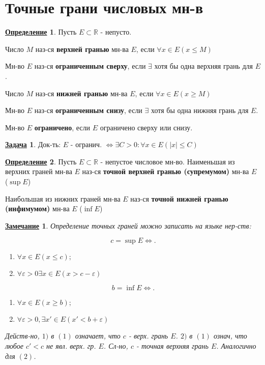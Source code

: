 \documentclass[12pt]{article}
\newcommand{\R}{\mathbb{R}}
\newtheorem*{note}{\underline{Замечание}}
\theoremstyle{definition}
\newtheorem{definition}{\underline{Определение}}[section]
\theoremstyle{definition}
\newtheorem{task}{\underline{Задача}}[section]
\begin{document}
\section{Точные грани числовых мн-в}
\begin{definition}
Пусть $E \subset \R$ - непусто.

Число $M$ наз-ся \textbf{верхней гранью} мн-ва $E$, если $\forall x \in E (x \leq M)$

Мн-во $E$ наз-ся \textbf{ограниченным сверху}, если $\exists $ хотя бы одна верхняя грань для $E$.

Число $M$ наз-ся \textbf{нижней гранью} мн-ва $E$, если $\forall x \in E (x \geq M)$

Мн-во $E$ наз-ся \textbf{ограниченным снизу}, если $\exists $ хотя бы одна нижняя грань для $E$.

Мн-во $E$ \textbf{ограничено}, если $E$ ограничено сверху или снизу.
\end{definition}
\begin{task}
Док-ть: $E \text{ - огранич. } \iff \exists C > 0 \colon  \forall x \in E (|x| \leq C)$
\end{task}

\begin{definition}
Пусть $E \subset \R$ - непустое числовое мн-во. Наименьшая из верхних граней мн-ва $E$ наз-ся \textbf{точной верхней гранью (супремумом)} мн-ва $E$ ($\sup E$)

Наибольшая из нижних граней мн-ва $E$ наз-ся \textbf{точной нижней гранью (инфимумом)} мн-ва $E$ ($\inf E$)
\end{definition}
\begin{note}
Определение точных граней можно записать на языке нер-ств:

\begin{equation}
    c = \sup E \iff
    .
\end{equation}
\begin{enumerate}
    \item [1) ] $\forall x \in E (x \leq c);$ 
    \item [2) ] $\forall  \varepsilon > 0  \exists  x \in E (x > c - \varepsilon)$
\end{enumerate}


\begin{equation}
b = \inf E \iff
.\end{equation} 
\begin{enumerate}
    \item [1) ] $\forall x \in E (x \geq b);$ 
    \item [2) ] $\forall \varepsilon > 0, \exists x' \in E (x' < b + \varepsilon)$
\end{enumerate}

Действ-но, $1)$ в $(1)$ означает, что $c$ - верх. грань $E$. $2)$ в $(1)$ означ, что любое $c' < c$ не явл. верх. гр. $E$. Сл-но, $c$ - точная верхняя грань $E$. Аналогично для  $(2)$.
\end{note}
\end{document}
